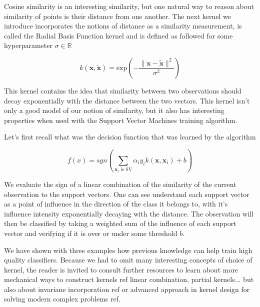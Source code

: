Cosine similarity is an interesting similarity, but one natural way to reason about similarity of points is their distance from one another. The next kernel we introduce incorporates the notions of distance as a similarity measurement, is called the Radial Basis Function kernel and is defined as followed for some hyperparameter $\sigma \in \mathbb{R}$

\begin{equation*}
  k(\mathbf{x}, \mathbf{\tilde{x}}) = \text{exp}\left(-\frac{\|\mathbf{x} - \mathbf{\tilde{x}}\|^2}{\sigma^2}\right)
\end{equation*}

This kernel contains the idea that similarity between two observations should decay exponentially with the distance between the two vectors. This kernel isn't only a good model of our notion of similarity, but it also has interesting properties when used with the Support Vector Machines training algorithm.

Let's first recall what was the decision function that was learned by the algorithm

\begin{equation*}
  f\left(x\right) = sgn\left(\sum_{\mathbf{x}_i \text{ is SV}}\alpha_iy_ik\left(\mathbf{x}, \mathbf{x}_i\right) + b\right)
\end{equation*}

We evaluate the sign of a linear combination of the similarity of the current observation to the support vectors. One can see understand each support vector as a point of influence in the direction of the class it belongs to, with it's influence intensity exponentially decaying with the distance. The observation will then be classified by taking a weighted sum of the influence of each support vector and verifying if it is over or under some threshold $b$.

We have shown with three examples how previous knowledge can help train high quality classifiers. Because we had to omit many interesting concepts of choice of kernel, the reader is invited to consult further resources to learn about more mechanical ways to construct kernels \textcolor[rgb]{1,0,0}{ref linear combination, partial kernels...} but also about invariane incorporation \textcolor[rgb]{1,0,0}{ref} or advanced approach in kernel design for solving modern complex problems \textcolor[rgb]{1,0,0}{ref}.

